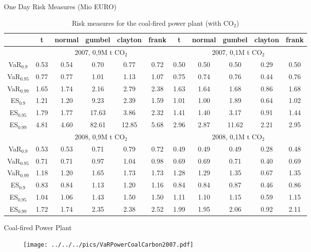 						
One Day Risk Measures (Mio EURO)
	\tiny
	\begin{table}[!ht]
                \begin{center}
                    \begin{tabular}{c|c|c|c|c|c|c|c|c|c|c}
                        &t&normal&gumbel&clayton&frank&t&normal&gumbel&clayton&frank\\\hline
                        &\multicolumn{5}{c|}{2007, 0,9M t CO$_2$}&\multicolumn{5}{|c}{2007, 0,1M t CO$_2$}\\\cline{2-11}
                        VaR$_{0.9}$&0.53&0.54&0.70&0.77&0.72&0.50&0.50&0.50&0.29&0.50\\
                        VaR$_{0.95}$&0.77&0.77&1.01&1.13&1.07&0.75&0.74&0.76&0.44&0.76\\
                        VaR$_{0.99}$&1.65&1.74&2.16&2.79&2.38&1.63&1.64&1.68&0.86&1.68\\
                        ES$_{0.9}$&1.21&1.20&9.23&2.39&1.59&1.01&1.00&1.89&0.64&1.02\\
                        ES$_{0.95}$&1.79&1.77&17.63&3.86&2.32&1.41&1.40&3.17&0.91&1.44\\
                        ES$_{0.99}$&4.81&4.60&82.61&12.85&5.68&2.96&2.87&11.62&2.21&2.95\\\cline{2-11}
                        &\multicolumn{5}{c|}{2008, 0,9M t CO$_2$}&\multicolumn{5}{|c}{2008, 0,1M t CO$_2$}\\\cline{2-11}
                        VaR$_{0.9}$&0.53&0.53&0.71&0.79&0.72&0.49&0.49&0.49&0.28&0.48\\
                        VaR$_{0.95}$&0.71&0.71&0.97&1.04&0.98&0.69&0.69&0.71&0.40&0.69\\
                        VaR$_{0.99}$&1.18&1.20&1.65&1.73&1.73&1.28&1.29&1.35&0.67&1.35\\
                        ES$_{0.9}$&0.83&0.84&1.13&1.20&1.16&0.84&0.84&0.87&0.46&0.86\\
                        ES$_{0.95}$&1.04&1.06&1.43&1.50&1.50&1.11&1.10&1.15&0.59&1.15\\
                        ES$_{0.99}$&1.72&1.74&2.35&2.38&2.52&1.99&1.95&2.06&0.92&2.11
                    \end{tabular}
                    \caption{Risk measures for the coal-fired power plant (with CO$_2$)}
                \end{center}
            \end{table}
						
						
Coal-fired Power Plant
	\begin{figure}
	\begin{center}
	\texttt{[image: ../../../pics/VaRPowerCoalCarbon2007.pdf]}
	\end{center}
	\end{figure}

